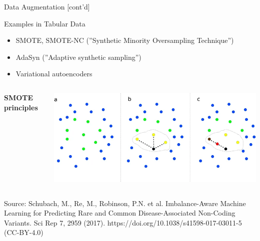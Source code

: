 \documentclass[ignorenonframetext,xcolor=x11names]{beamer}
\begin{document}
\begin{frame}{Data Augmentation \small [cont'd]}
\begin{block}{Examples in Tabular Data}
\begin{itemize}
   \item SMOTE, SMOTE-NC (''Synthetic Minority Oversampling Technique'')
   \item AdaSyn (''Adaptive synthetic sampling'')
   \item Variational autoencoders
\end{itemize}
\end{block}

\begin{columns}
\begin{column}{0.2\textwidth}
\textbf{SMOTE principles}
\end{column}
\begin{column}{0.8\textwidth}
\includegraphics[width=\textwidth]{smote.png} 
\end{column}
\end{columns}

\centering

\tiny Source: Schubach, M., Re, M., Robinson, P.N. et al. Imbalance-Aware Machine Learning for Predicting Rare and Common Disease-Associated Non-Coding Variants. Sci Rep 7, 2959 (2017). https://doi.org/10.1038/s41598-017-03011-5 (CC-BY-4.0)
\normalsize
\end{frame}
\end{document}
